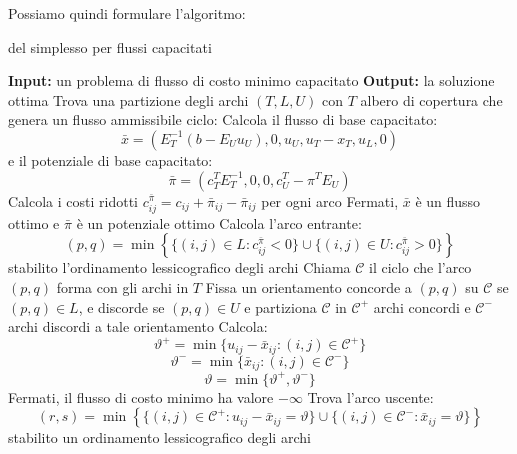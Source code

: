\documentclass[a4paper,11pt]{article}
\begin{document}
Possiamo quindi formulare l'algoritmo:
\begin{algorithm}[H]
\caption{del simplesso per flussi capacitati}
\begin{algorithmic}
	\STATE \textbf{Input:} un problema di flusso di costo minimo capacitato
	\STATE \textbf{Output:} la soluzione ottima 
	\STATE Trova una partizione degli archi $(T,L,U)$ con $T$ albero di copertura che genera un flusso ammissibile
	\STATE \textsf{ciclo:}
	\STATE Calcola il flusso di base capacitato:
	$$
	\bar{x} = \left(E_T^{-1} (b - E_U u_U), 0, u_U, u_T - x_T, u_L, 0\right) $$
	e il potenziale di base capacitato:
	$$
	\bar{\pi} = \left( c_T^T E_T^{-1}, 0, 0, c_U^T - \pi^T E_U \right)
	$$
	\STATE Calcola i costi ridotti $c_{ij}^{\bar{\pi}} = c_{ij} + \bar{\pi}_{ij} - \bar{\pi}_{ij}$ per ogni arco
	\STATE Fermati, $\bar{x}$ è un flusso ottimo e $\bar{\pi}$ è un potenziale ottimo
\ELSE
		\STATE Calcola l'arco entrante: 
		$$
		(p, q) = \min \left\{ \{ (i, j) \in L : c_{ij}^{\bar{\pi}} < 0 \} \cup \{ (i, j) \in U : c_{ij}^{\bar{\pi}} > 0 \} \right\}
		$$
		stabilito l'ordinamento lessicografico degli archi
		\STATE Chiama $\mathcal{C}$ il ciclo che l'arco $(p, q)$ forma con gli archi in $T$
		\STATE Fissa un orientamento concorde a $(p,q)$ su $\mathcal{C}$ se $(p,q) \in L$, e discorde se $(p,q) \in U$ e partiziona $\mathcal{C}$ in $\mathcal{C^+}$ archi concordi e $\mathcal{C^-}$ archi discordi a tale orientamento
	\ENDIF
		\STATE Calcola:
		$$
		\vartheta^+ = \min\{ u_{ij} - \bar{x}_{ij} : (i, j) \in \mathcal{C}^+ \}
		$$
		$$
		\vartheta^- = \min\{ \bar{x}_{ij} : (i, j) \in \mathcal{C}^- \}
		$$
		$$
		\vartheta = \min\{\vartheta^+, \vartheta^-\}
		$$
	\IF{$\vartheta = \infty$}
		\STATE Fermati, il flusso di costo minimo ha valore $-\infty$ 
	\ELSE
		\STATE Trova l'arco uscente: 
		$$ 
		(r, s) = \min \left\{ \{(i, j) \in \mathcal{C}^+ : u_{ij} - \bar{x}_{ij} = \vartheta \} \cup \{(i, j) \in \mathcal{C}^- : \bar{x}_{ij} = \vartheta \} \right\} 
		$$
		stabilito un ordinamento lessicografico degli archi
	\ENDIF
\end{algorithmic}
\end{algorithm}
\end{document}
